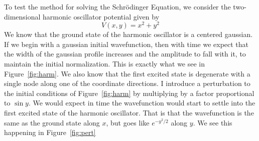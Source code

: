 \documentclass[paper=a4, fontsize=11pt, abstract=on]{scrartcl} %
\numberwithin{equation}{section}
\numberwithin{figure}{section}
\numberwithin{table}{section}
\begin{document}
To test the method for solving the Schr\"{o}dinger Equation, we consider the two-dimensional harmonic oscillator potential given by
\begin{equation}
  \label{eq:harm}
  V(x,y) = x^2 + y^2
\end{equation}
We know that the ground state of the harmonic oscillator is a centered gaussian\cite{griff}. If we begin with a gaussian initial wavefunction, then with time we expect that the width of the gaussian profile increases and the amplitude to fall with it, to maintain the initial normalization. This is exactly what we see in Figure~\ref{fig:harm}. We also know that the first excited state is degenerate with a single node along one of the coordinate directions. I introduce a perturbation to the initial conditions of Figure~\ref{fig:harm} by multiplying by a factor proportional to $\sin y$. We would expect in time the wavefunction would start to settle into the first excited state of the harmonic oscillator. That is that the wavefunction is the same as the ground state along $x$, but goes like $e^{-y^2/2}$ along $y$. We see this happening in Figure~\ref{fig:pert}
\end{document}
